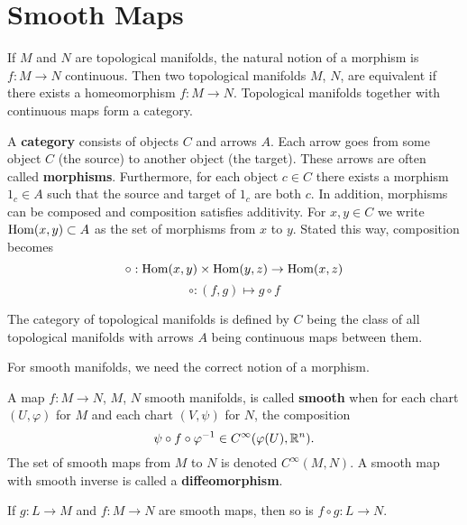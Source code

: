 \section{Smooth Maps}
If $M$ and $N$ are topological manifolds, the natural notion of a 
morphism is $f : M \to N$ continuous. Then two topological manifolds
$M$, $N$, are equivalent if there exists a homeomorphism $f : M \to N$. 
Topological manifolds together with continuous maps form a category.

\begin{definition}
A \textbf{category} consists of objects $C$ and arrows $A$. Each arrow
goes from some object $C$ (the source) to another object (the target).
These arrows are often called \textbf{morphisms}. Furthermore, for each
object $c \in C$ there exists a morphism $1_c \in A$ such that the source
and target of $1_c$ are both $c$. In addition, morphisms can be composed
and composition satisfies additivity. For $x, y \in C$ we write 
$\operatorname{Hom}(x,y) \subset A$ as the set of morphisms from $x$ to $y$. Stated this
way, composition becomes
\[ \circ : \operatorname{Hom}(x,y) \times \operatorname{Hom}(y,z) \to \operatorname{Hom}(x,z) \]
\[ \circ : (f,g) \mapsto g \circ f \]
\end{definition}

\begin{example}
The category of topological manifolds is defined by $C$ being the class of
all topological manifolds with arrows $A$ being continuous maps between them.
\end{example}

For smooth manifolds, we need the correct notion of a morphism.

\begin{definition}
A map $f : M \to N$, $M$, $N$ smooth manifolds, is called \textbf{smooth}
when for each chart $(U,\varphi)$ for $M$ and each chart $(V,\psi)$ for 
$N$, the composition
\[
\psi \circ f \circ \varphi^{-1} \in C^\infty(\varphi(U),\mathbb{R}^n).
\]
The set of smooth maps from $M$ to $N$ is denoted $C^\infty (M,N)$. A smooth
map with smooth inverse is called a \textbf{diffeomorphism}.
\end{definition}

\begin{lemma}
If $g : L \to M$ and $f : M \to N$ are smooth maps, then so is 
$f \circ g : L \to N$.
\end{lemma}
